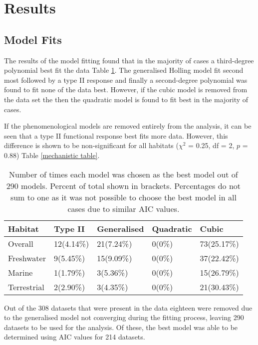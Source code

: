 \documentclass[a4paper]{article}
\numberwithin{equation}{section}
\begin{document}
\section{Results}
\subsection{Model Fits}
The results of the model fitting found that in the majority of cases a third-degree polynomial best fit the data Table \ref{fit table}.  The generalised Holling model fit second most followed by a type II response and finally a second-degree polynomial was found to fit none of the data best.  However, if the cubic model is removed from the data set the then the quadratic model is found to fit best in the majority of cases. 

If the phenomenological models are removed entirely from the analysis, it can be seen that a type II functional response best fits more data.  However, this difference is shown to be non-significant for all habitats ($\chi ^2$ = 0.25, df = 2, $p$ = 0.88) Table \ref{mechanistic table}.

\begin{center}
	\begin{table}[h]
				\caption{Number of times each model was chosen as the best model out of 290 models.  Percent of total shown in brackets.  Percentages do not sum to one as it was not possible to choose the best model in all cases due to similar AIC values.}
				\label{fit table}
				\vspace{2mm}
		\begin{tabular}{|| p{1.8cm} |p{1.8cm} | p{1.8cm} | p{1.8cm} | p{1.8cm}||} 
			\hline
			Habitat & Type II & Generalised & Quadratic & Cubic \\  
			\hline\hline
			Overall & 12(4.14\%) & 21(7.24\%) & 0(0\%) & 73(25.17\%) \\ 
			
			Freshwater & 9(5.45\%) & 15(9.09\%) & 0(0\%) & 37(22.42\%) \\
		
			Marine & 1(1.79\%) & 3(5.36\%) & 0(0\%) & 15(26.79\%) \\
		
			Terrestrial & 2(2.90\%) & 3(4.35\%) & 0(0\%) & 21(30.43\%) \\
			\hline
		\end{tabular}
	\end{table}	
\end{center}

Out of the 308 datasets that were present in the data eighteen were removed due to the generalised model not converging during the fitting process, leaving 290 datasets to be used for the analysis.  Of these, the best model was able to be determined using AIC values for 214 datasets.  
\end{document}
